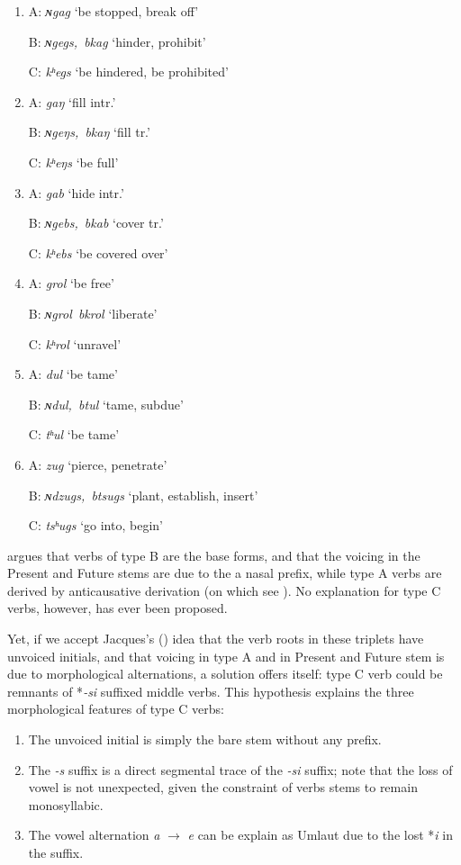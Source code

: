 \documentclass[oneside,a4paper,11pt]{article}
\newcommand{\ipa}[1]{{\phon\textit{\mbox{#1}}}}
\newcommand{\tib}[2]{\ipa{#1} `#2'}
\begin{document}
\begin{enumerate}
\item 
A: \tib{ɴgag}{be stopped, break off}

B: \tib{ɴgegs, bkag}{hinder, prohibit}

C: \tib{kʰegs}{be hindered, be prohibited}

\item 
A: \tib{gaŋ}{fill intr.}

B: \tib{ɴgeŋs, bkaŋ}{fill tr.}

C: \tib{kʰeŋs}{be full}

\item 
A: \tib{gab}{hide intr.}

B: \tib{ɴgebs, bkab}{cover tr.}

C: \tib{kʰebs}{be covered over}

\item 
A: \tib{grol}{be free}

B: \tib{ɴgrol  bkrol}{liberate}

C: \tib{kʰrol}{unravel}

\item 
A: \tib{dul}{be tame}

B: \tib{ɴdul, btul}{tame, subdue}

C: \tib{tʰul}{be tame}

\item 
A: \tib{zug}{pierce, penetrate}

B: \tib{ɴdzugs, btsugs}{plant, establish, insert}

C: \tib{tsʰugs}{go into, begin}
\end{enumerate}

\citet{jacques12internal} argues that verbs of type B are the base forms, and that the voicing in the Present and Future stems are due to the a nasal prefix, while type A verbs are derived by anticausative derivation (on which see \citealt{jacques15spontaneous, jacques15causative}). No explanation for type C verbs, however, has ever been proposed.  

Yet, if we accept Jacques's (\citeyear{jacques12internal}) idea that the verb roots in these triplets have unvoiced initials, and that voicing in type A and in Present and Future stem is due to morphological alternations, a solution offers itself: type C verb could be remnants of *\ipa{-si} suffixed middle verbs. This hypothesis explains the three morphological features of type C verbs:

\begin{enumerate}
\item The unvoiced initial is simply the bare stem without any prefix.
\item The \ipa{-s} suffix is a direct segmental trace of the \ipa{-si} suffix; note that the loss of vowel is not unexpected, given the constraint of verbs stems to remain monosyllabic.
\item The vowel alternation \ipa{a} $\rightarrow$ \ipa{e} can be explain as Umlaut due to the lost *\ipa{i} in the suffix. 
\end{enumerate}
\end{document}
